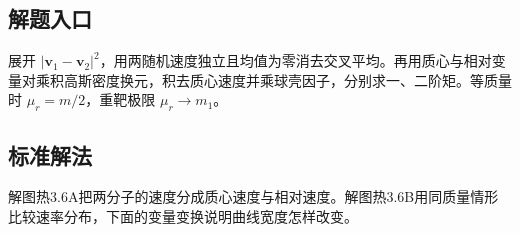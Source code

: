 \documentclass[UTF8,fontset=fandol,a4paper,11pt]{ctexart}
\begin{document}


\subsection*{解题入口}

展开 $|\bm v_1-\bm v_2|^2$，用两随机速度独立且均值为零消去交叉平均。再用质心与相对变量对乘积高斯密度换元，积去质心速度并乘球壳因子，分别求一、二阶矩。等质量时 $\mu_r=m/2$，重靶极限 $\mu_r\to m_1$。




\subsection*{标准解法}

解图热3.6A把两分子的速度分成质心速度与相对速度。解图热3.6B用同质量情形比较速率分布，下面的变量变换说明曲线宽度怎样改变。
\end{document}
